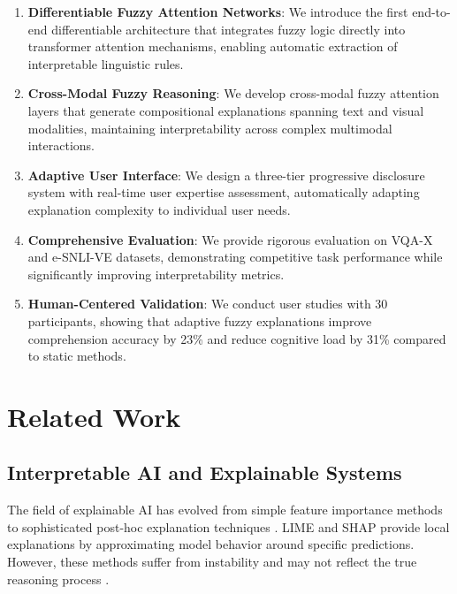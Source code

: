 \documentclass[manuscript,review,anonymous]{acmart}
\begin{document}
\begin{enumerate}
    \item \textbf{Differentiable Fuzzy Attention Networks}: We introduce the first end-to-end differentiable architecture that integrates fuzzy logic directly into transformer attention mechanisms, enabling automatic extraction of interpretable linguistic rules.

    \item \textbf{Cross-Modal Fuzzy Reasoning}: We develop cross-modal fuzzy attention layers that generate compositional explanations spanning text and visual modalities, maintaining interpretability across complex multimodal interactions.

    \item \textbf{Adaptive User Interface}: We design a three-tier progressive disclosure system with real-time user expertise assessment, automatically adapting explanation complexity to individual user needs.

    \item \textbf{Comprehensive Evaluation}: We provide rigorous evaluation on VQA-X and e-SNLI-VE datasets, demonstrating competitive task performance while significantly improving interpretability metrics.

    \item \textbf{Human-Centered Validation}: We conduct user studies with 30 participants, showing that adaptive fuzzy explanations improve comprehension accuracy by 23\% and reduce cognitive load by 31\% compared to static methods.
\end{enumerate}

\section{Related Work}

\subsection{Interpretable AI and Explainable Systems}

The field of explainable AI has evolved from simple feature importance methods to sophisticated post-hoc explanation techniques \cite{adadi2018peeking}. LIME \cite{ribeiro2016should} and SHAP \cite{lundberg2017unified} provide local explanations by approximating model behavior around specific predictions. However, these methods suffer from instability and may not reflect the true reasoning process \cite{alvarez2018towards}.
\end{document}

